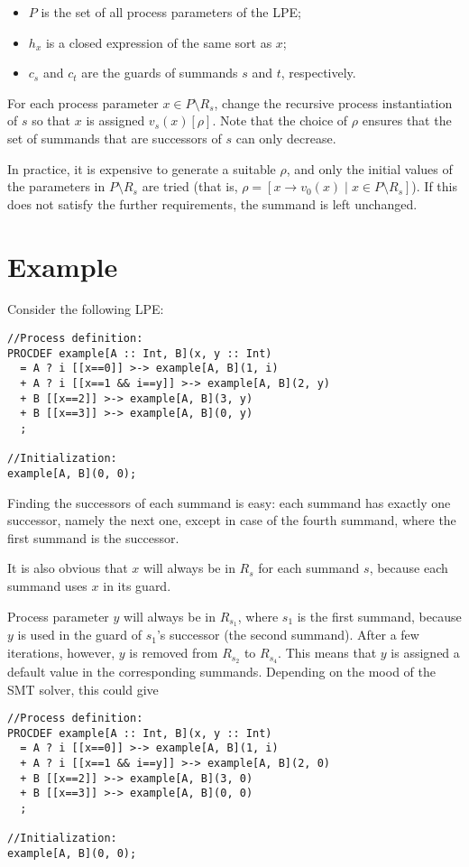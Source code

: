 \begin{enumerate}
\begin{itemize}
\item $P$ is the set of all process parameters of the LPE;
\item $h_x$ is a closed expression of the same sort as $x$;
\item $c_s$ and $c_t$ are the guards of summands $s$ and $t$, respectively.
\end{itemize}

For each process parameter $x \in P \setminus R_s$, change the recursive process instantiation of $s$ so that $x$ is assigned $v_s(x)[\rho]$.
Note that the choice of $\rho$ ensures that the set of summands that are successors of $s$ can only decrease.

In practice, it is expensive to generate a suitable $\rho$, and only the initial values of the parameters in $P \setminus R_s$ are tried (that is, $\rho = [x \rightarrow v_0(x) \;|\; x \in P \setminus R_s]$).
If this does not satisfy the further requirements, the summand is left unchanged.

\end{enumerate}

\section{Example}

Consider the following LPE:

\begin{lstlisting}
//Process definition:
PROCDEF example[A :: Int, B](x, y :: Int)
  = A ? i [[x==0]] >-> example[A, B](1, i)
  + A ? i [[x==1 && i==y]] >-> example[A, B](2, y)
  + B [[x==2]] >-> example[A, B](3, y)
  + B [[x==3]] >-> example[A, B](0, y)
  ;

//Initialization:
example[A, B](0, 0);
\end{lstlisting}

Finding the successors of each summand is easy: each summand has exactly one successor, namely the next one, except in case of the fourth summand, where the first summand is the successor.

It is also obvious that $x$ will always be in $R_s$ for each summand $s$, because each summand uses $x$ in its guard.

Process parameter $y$ will always be in $R_{s_1}$, where $s_1$ is the first summand, because $y$ is used in the guard of $s_1$'s successor (the second summand).
After a few iterations, however, $y$ is removed from $R_{s_2}$ to $R_{s_4}$.
This means that $y$ is assigned a default value in the corresponding summands.
Depending on the mood of the SMT solver, this could give

\begin{lstlisting}
//Process definition:
PROCDEF example[A :: Int, B](x, y :: Int)
  = A ? i [[x==0]] >-> example[A, B](1, i)
  + A ? i [[x==1 && i==y]] >-> example[A, B](2, 0)
  + B [[x==2]] >-> example[A, B](3, 0)
  + B [[x==3]] >-> example[A, B](0, 0)
  ;

//Initialization:
example[A, B](0, 0);
\end{lstlisting}




